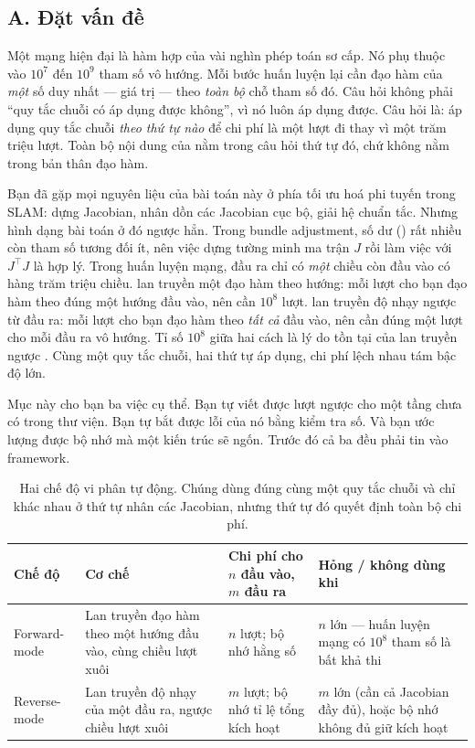 \documentclass[../../../deep_learning.tex]{subfiles}
\begin{document}
\subsection{A. Đặt vấn đề}
Một mạng hiện đại là hàm hợp của vài nghìn phép toán sơ cấp. Nó phụ thuộc vào \(10^7\) đến \(10^9\) tham số vô hướng. Mỗi bước huấn luyện lại cần đạo hàm của \emph{một} số duy nhất --- giá trị  --- theo \emph{toàn bộ} chỗ tham số đó. Câu hỏi không phải ``quy tắc chuỗi có áp dụng được không'', vì nó luôn áp dụng được. Câu hỏi là: áp dụng quy tắc chuỗi \emph{theo thứ tự nào} để chi phí là một lượt đi thay vì một trăm triệu lượt. Toàn bộ nội dung của  nằm trong câu hỏi thứ tự đó, chứ không nằm trong bản thân đạo hàm.

Bạn đã gặp mọi nguyên liệu của bài toán này ở phía tối ưu hoá phi tuyến trong SLAM: dựng Jacobian, nhân dồn các Jacobian cục bộ, giải hệ chuẩn tắc. Nhưng hình dạng bài toán ở đó ngược hẳn. Trong bundle adjustment, số dư () rất nhiều còn tham số tương đối ít, nên việc dựng tường minh ma trận \(J\) rồi làm việc với \(J^\top J\) là hợp lý. Trong huấn luyện mạng, đầu ra chỉ có \emph{một} chiều còn đầu vào có hàng trăm triệu chiều.  lan truyền một đạo hàm theo hướng: mỗi lượt cho bạn đạo hàm theo đúng một hướng đầu vào, nên cần \(10^8\) lượt.  lan truyền độ nhạy ngược từ đầu ra: mỗi lượt cho bạn đạo hàm theo \emph{tất cả} đầu vào, nên cần đúng một lượt cho mỗi đầu ra vô hướng. Tỉ số \(10^8\) giữa hai cách là lý do tồn tại của lan truyền ngược \cite{rumelhart1986}. Cùng một quy tắc chuỗi, hai thứ tự áp dụng, chi phí lệch nhau tám bậc độ lớn.

Mục này cho bạn ba việc cụ thể. Bạn tự viết được lượt ngược cho một tầng chưa có trong thư viện. Bạn tự bắt được lỗi của nó bằng kiểm tra số. Và bạn ước lượng được bộ nhớ mà một kiến trúc sẽ ngốn. Trước đó cả ba đều phải tin vào framework. \begin{table}[H]\centering\small
\caption{Hai chế độ vi phân tự động. Chúng dùng đúng cùng một quy tắc chuỗi và chỉ khác nhau ở thứ tự nhân các Jacobian, nhưng thứ tự đó quyết định toàn bộ chi phí.}
\label{tab:fwd-rev}
\begin{tabularx}{\linewidth}{@{}L{2.3cm}YYL{3.1cm}@{}}
\toprule
\textbf{Chế độ} & \textbf{Cơ chế} & \textbf{Chi phí cho \(n\) đầu vào, \(m\) đầu ra} & \textbf{Hỏng / không dùng khi}\\
\midrule
Forward-mode & Lan truyền đạo hàm theo một hướng đầu vào, cùng chiều lượt xuôi & \(n\) lượt; bộ nhớ hằng số & \(n\) lớn --- huấn luyện mạng có \(10^8\) tham số là bất khả thi\\
Reverse-mode & Lan truyền độ nhạy của một đầu ra, ngược chiều lượt xuôi & \(m\) lượt; bộ nhớ tỉ lệ tổng kích hoạt & \(m\) lớn (cần cả Jacobian đầy đủ), hoặc bộ nhớ không đủ giữ kích hoạt\\
\bottomrule
\end{tabularx}
\end{table}
\end{document}
